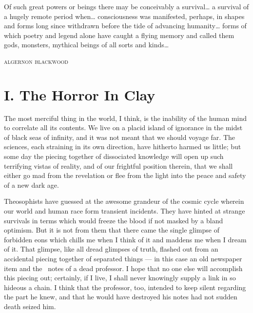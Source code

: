 
\thispagestyle{empty}

\epigraph{Of such great powers or beings there may be conceivably a
survival\ldots{} a survival of a hugely remote period when\ldots{}
consciousness was manifested, perhaps, in shapes and forms long since
withdrawn before the tide of advancing humanity\ldots{} forms of which
poetry and legend alone have caught a flying memory and called them
gods, monsters, mythical beings of all sorts and kinds\ldots{}}{\textsc{algernon blackwood}}

\chapter*{I. The Horror In Clay}

The most merciful thing in the world, I think, is the inability of the
human mind to correlate all its contents. We live on a placid island of
ignorance in the midst of black seas of infinity, and it was not meant
that we should voyage far. The sciences, each straining in its own
direction, have hitherto harmed us little; but some day the piecing
together of dissociated knowledge will open up such terrifying vistas of
reality, and of our frightful position therein, that we shall either go
mad from the revelation or flee from the light into the peace and safety
of a new dark age.

Theosophists have guessed at the awesome grandeur of the cosmic cycle
wherein our world and human race form transient incidents. They have
hinted at strange survivals in terms which would freeze the blood if not
masked by a bland optimism. But it is not from them that there came the
single glimpse of forbidden eons which chills me when I think of it and
maddens me when I dream of it. That glimpse, like all dread glimpses of
truth, flashed out from an accidental piecing together of separated
things --- in this case an old newspaper item and the \est\ notes of a dead
professor. I hope that no one else will accomplish this piecing out;
certainly, if I live, I shall never knowingly supply a link in so
hideous a chain. I think that the professor, too, intended to keep
silent regarding the part he knew, and that he would have destroyed his
notes had not sudden death seized him.

